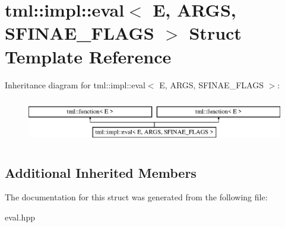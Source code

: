 \hypertarget{structtml_1_1impl_1_1eval}{\section{tml\+:\+:impl\+:\+:eval$<$ E, A\+R\+G\+S, S\+F\+I\+N\+A\+E\+\_\+\+F\+L\+A\+G\+S $>$ Struct Template Reference}
\label{structtml_1_1impl_1_1eval}
}
Inheritance diagram for tml\+:\+:impl\+:\+:eval$<$ E, A\+R\+G\+S, S\+F\+I\+N\+A\+E\+\_\+\+F\+L\+A\+G\+S $>$\+:\begin{figure}[H]
\begin{center}
\leavevmode
\includegraphics[height=2.000000cm]{structtml_1_1impl_1_1eval}
\end{center}
\end{figure}
\subsection*{Additional Inherited Members}


The documentation for this struct was generated from the following file\+:\begin{DoxyCompactItemize}
\item 
eval.\+hpp\end{DoxyCompactItemize}
